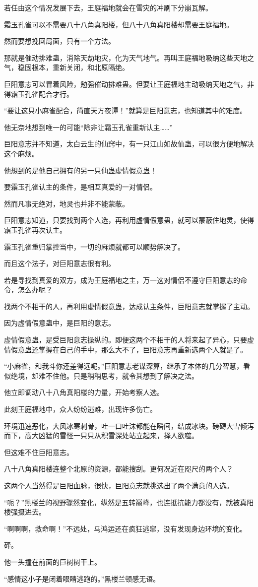 \begin{this_body}
若任由这个情况发展下去，王庭福地就会在雪灾的冲刷下分崩瓦解。

霜玉孔雀可以不需要八十八角真阳楼，但八十八角真阳楼却需要王庭福地。

然而要想挽回局面，只有一个方法。

那就是催动排难蛊，消除天劫地灾，化为天气地气。再叫王庭福地吸纳这些天地之气，稳固根本，重新关闭，和北原隔绝。

巨阳意志可以冒着风险，勉强催动排难蛊。但要让王庭福地主动吸纳天地之气，非得霜玉孔雀配合才行。

“要让这只小麻雀配合，简直天方夜谭！”就算是巨阳意志，也知道其中的难度。

他无奈地想到唯一的可能“除非让霜玉孔雀重新认主……”

巨阳意志并不知道，太白云生的仙窍中，有一只江山如故仙蛊，可以很方便地解决这个麻烦。

他想到的是他自己拥有的另一只仙蛊虚情假意蛊！

要霜玉孔雀认主的条件，是相互真爱的一对情侣。

然而凡事无绝对，地灵也并非不能蒙蔽。

巨阳意志知道，只要找到两个人选，再利用虚情假意蛊，就可以蒙蔽住地灵，使得霜玉孔雀再次认主。

霜玉孔雀重归掌控当中，一切的麻烦就都可以顺势解决了。

而且这个法子，对巨阳意志很有利。

若是寻找到真爱的双方，成为王庭福地之主，万一这对情侣不遵守巨阳意志的命令，怎么办呢？

找两个不相干的人，再利用虚情假意蛊，达成认主条件，巨阳意志就掌握了主动。

因为虚情假意蛊中，是巨阳的意志。

虚情假意蛊，是受巨阳意志操纵的。即便这两个不相干的人将来起了异心，只要虚情假意蛊还掌握在自己的手中，那么大不了，巨阳意志再重新选两个人就是了。

“小麻雀，和我斗你还差得远呢。”巨阳意志老谋深算，继承了本体的几分智慧，看似绝境，却难不住他。只是稍稍思考，就令其想到了解决之法。

他立即调动八十八角真阳楼的力量，开始考察人选。

此刻王庭福地中，众人纷纷逃难，出现许多伤亡。

环境迅速恶化，大风冰寒刺骨，吐一口吐沫都能在瞬间，结成冰块。磅礴大雪倾泻而下，高大凶猛的雪怪一只只从积雪深处站立起来，择人欲噬。

但这难不住巨阳意志。

八十八角真阳楼连整个北原的资源，都能搜刮。更何况近在咫尺的两个人？

这两个人当然得是巨阳血脉，很快，巨阳意志就挑选出了两个满意的人选。

“呃？”黑楼兰的视野骤然变化，纵然是五转巅峰，也连抵抗能力都没有，就被真阳楼强摄进去。

“啊啊啊，救命啊！”不远处，马鸿运还在疯狂逃窜，没有发现身边环境的变化。

砰。

他一头撞在前面的巨树树干上。

“感情这小子是闭着眼睛逃跑的。”黑楼兰顿感无语。

\end{this_body}


